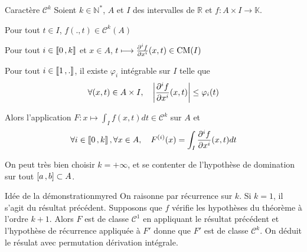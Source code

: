     \begin{theo}{Caractère $\mathcal{C}^k$}{}
        Soient $k \in \mathbb{N}^*$, $A$ et $I$ des intervalles de $\mathbb{R}$ et $f : A \times I \to \mathbb{K}$. 
        \begin{suppose}
            \item Pour tout $t \in I$, $f(.,t) \in \mathcal{C}^k(A)$
            \item Pour tout $i \in \left\llbracket 0 \, , k \right\rrbracket$ et $x \in A$, $t \longmapsto \frac{\partial^i f}{\partial x^i}(x,t) \in \operatorname{CM}(I)$
            \item Pour tout $i \in \left\llbracket 1 \, , . \right\rrbracket$, il existe $\varphi_i$ intégrable sur $I$ telle que 
            \[ \forall (x,t) \in A \times I, \quad \left\lvert \frac{\partial^i f}{\partial x^i}(x,t)\right\rvert \leq \varphi_i(t) \]
        \end{suppose}
        Alors l’application $F : x \mapsto \int_I f(x,t)dt \in \mathcal{C}^k$ sur $A$ et 
        \[ \forall i \in \left\llbracket 0 \, , k \right\rrbracket, \forall x \in A, \quad F^{(i)}(x) = \int_I \frac{\partial^i f}{\partial x^i}(x,t)dt \]   
    \end{theo}

    On peut très bien choisir $k = +\infty$, et se contenter de l’hypothèse de domination sur tout $\left[ a \, , b \right] \subset A$.    

    \begin{demo}{Idée de la démonstration}{myred}
        On raisonne par récurrence sur $k$. Si $k = 1$, il s’agit du résultat précédent. Supposons que $f$ vérifie les hypothèses du théorème à l’ordre $k+1$. Alors $F$ est de classe $\mathcal{C}^1$ en appliquant le résultat précédent et l’hypothèse de récurrence appliquée à $F'$ donne que $F'$ est de classe $\mathcal{C}^k$. On déduit le résulat avec permutation dérivation intégrale.
    \end{demo}

